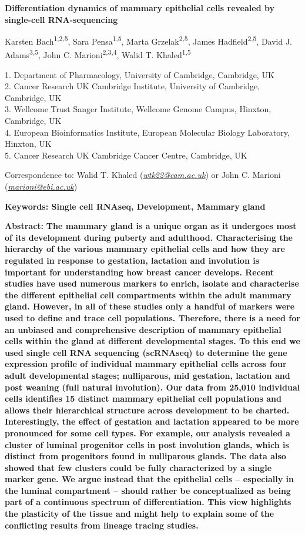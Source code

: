 \documentclass[titlepage, 12pt, oneside]{amsart}
\begin{document}
\begin{titlepage}
\large
\textbf{Differentiation dynamics of mammary epithelial cells revealed by
single-cell RNA-sequencing}
\normalsize

\small
Karsten Bach\textsuperscript{1,2,5}, Sara Pensa\textsuperscript{1,5},
Marta Grzelak\textsuperscript{2,5}, James Hadfield\textsuperscript{2,5},
David J. Adams\textsuperscript{3,5}, John C.
Marioni\textsuperscript{2,3,4}, Walid T. Khaled\textsuperscript{1,5 }

1. Department of Pharmacology, University of Cambridge, Cambridge, UK\\
2. Cancer Research UK Cambridge Institute, University of Cambridge,
Cambridge, UK\\
3. Wellcome Trust Sanger Institute, Wellcome Genome Campus, Hinxton,
Cambridge, UK\\
4. European Bioinformatics Institute, European Molecular Biology
Laboratory, Hinxton, UK\\
5. Cancer Research UK Cambridge Cancer Centre, Cambridge, UK

Correspondence to: Walid T. Khaled
(\href{mailto:wtk22@cam.ac.uk}{\emph{wtk22@cam.ac.uk}}) or John C.
Marioni (\href{mailto:marioni@ebi.ac.uk}{\emph{marioni@ebi.ac.uk}})

\normalsize
\textbf{Keywords: Single cell RNAseq, Development, Mammary gland }
\end{titlepage}
\onehalfspacing
\textbf{Abstract:}
\textbf{The mammary gland is a unique organ as it undergoes most of its development during puberty and adulthood.
Characterising the hierarchy of the various mammary epithelial cells and how they are regulated in response to gestation, lactation and involution is important for understanding how breast cancer develops.
Recent studies have used numerous markers to enrich, isolate and characterise the different epithelial cell compartments within the adult mammary gland.
However, in all of these studies only a handful of markers were used to define and trace cell populations.
Therefore, there is a need for an unbiased and comprehensive description of mammary epithelial cells within the gland at different developmental stages.
To this end we used single cell RNA sequencing (scRNAseq) to determine the gene expression profile of individual mammary epithelial cells across four adult developmental stages; nulliparous, mid gestation, lactation and post weaning (full natural involution).
Our data from 25,010 individual cells identifies 15 distinct mammary epithelial cell populations and allows their hierarchical structure across development to be charted.
Interestingly, the effect of gestation and lactation appeared to be more pronounced for some cell types.
For example, our analysis revealed a cluster of luminal progenitor cells in post involution glands, which is distinct from progenitors found in nulliparous glands.
The data also showed that few clusters could be fully characterized by a single marker gene.
We argue instead that the epithelial cells -- especially in the luminal compartment -- should rather be conceptualized as being part of a continuous spectrum of differentiation.
This view highlights the plasticity of the tissue and might help to explain some of the conflicting results from lineage tracing studies.}
\newpage
\end{document}
